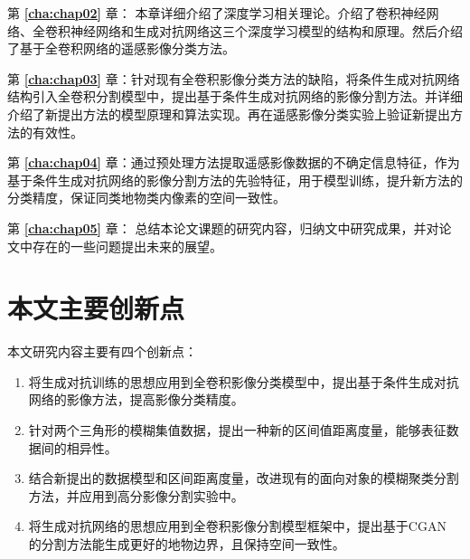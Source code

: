 第 \textbf{\ref{cha:chap02}} 章： 本章详细介绍了深度学习相关理论。介绍了卷积神经网络、全卷积神经网络和生成对抗网络这三个深度学习模型的结构和原理。然后介绍了基于全卷积网络的遥感影像分类方法。


第 \textbf{\ref{cha:chap03}} 章：针对现有全卷积影像分类方法的缺陷，将条件生成对抗网络结构引入全卷积分割模型中，提出基于条件生成对抗网络的影像分割方法。并详细介绍了新提出方法的模型原理和算法实现。再在遥感影像分类实验上验证新提出方法的有效性。

第 \textbf{\ref{cha:chap04}} 章：通过预处理方法提取遥感影像数据的不确定信息特征，作为基于条件生成对抗网络的影像分割方法的先验特征，用于模型训练，提升新方法的分类精度，保证同类地物类内像素的空间一致性。

第 \textbf{\ref{cha:chap05}} 章： 总结本论文课题的研究内容，归纳文中研究成果，并对论文中存在的一些问题提出未来的展望。


\section{本文主要创新点}
\label{sec:forth}
本文研究内容主要有四个创新点：
\begin{enumerate}[(1)]
    \item 将生成对抗训练的思想应用到全卷积影像分类模型中，提出基于条件生成对抗网络的影像方法，提高影像分类精度。
    \item 针对两个三角形的模糊集值数据，提出一种新的区间值距离度量，能够表征数据间的相异性。
    \item 结合新提出的数据模型和区间距离度量，改进现有的面向对象的模糊聚类分割方法，并应用到高分影像分割实验中。
    \item 将生成对抗网络的思想应用到全卷积影像分割模型框架中，提出基于CGAN 的分割方法能生成更好的地物边界，且保持空间一致性。

\end{enumerate}
